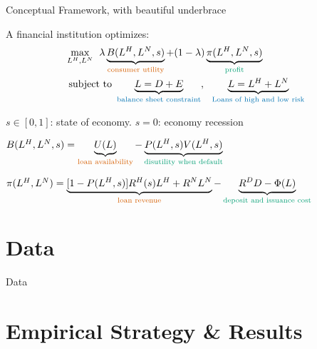 \documentclass[notes,11pt, aspectratio=169]{beamer}
\newenvironment{wideitemize}{\itemize\addtolength{\itemsep}{10pt}}{\enditemize}  %
\begin{document}
\begin{frame}{Conceptual Framework, with beautiful underbrace}

A financial institution optimizes:
\begin{align*}
	& \max_{L^H, L^N}  \:\:  \lambda \underbrace{ B(L^H,L^N, s)}_{\text{\textcolor{red}{consumer utility}}} + (1-\lambda) \underbrace{ \pi(L^H, L^N,s)}_{\text{\textcolor{green}{profit}}} \\
	& \text{ subject to  } \underbrace{L = D + E}_{\text{\textcolor{blue}{balance sheet constraint}}}, \:\:\: \underbrace{L = L^H + L^N}_{\text{\textcolor{blue}{Loans of high and low risk}}} 
\end{align*}
\begin{wideitemize}
    \item <1-> $s \in [0,1]$: state of economy. $s=0$: economy recession
    \item <2-> $B(L^H, L^N, s)= \underbrace{U(L)}_{\text{\textcolor{red}{loan availability}}}-\underbrace{P(L^H, s) V(L^H,s)}_{\text{\textcolor{green}{disutility when default}}}$ 
	\item <3> $\pi(L^H, L^N)  = \underbrace{[1-P(L^H, s)]R^H(s) L^H + R^N L^N}_{\text{\textcolor{red}{loan revenue}}} - \underbrace{R^D D -\Phi(L)}_{\text{\textcolor{green}{deposit and issuance cost}}}$
\end{wideitemize}
\end{frame}




\section{Data}

\begin{frame}{Data}
\end{frame}



\section{Empirical Strategy \& Results}
\end{document}
